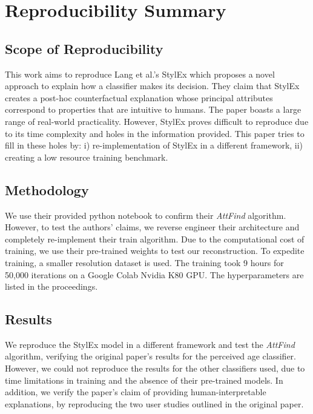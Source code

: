 \section*{\centering Reproducibility Summary}

\subsection*{Scope of Reproducibility}

This work aims to reproduce Lang et al.'s StylEx \cite{Lang2021ExplainingIS} which proposes a novel approach to explain how a classifier makes its decision. They claim that StylEx creates a post-hoc counterfactual explanation whose principal attributes correspond to properties that are intuitive to humans. The paper boasts a large range of real-world practicality. However, StylEx proves difficult to reproduce due to its time complexity and holes in the information provided. This paper tries to fill in these holes by: i) re-implementation of StylEx in a different framework, ii) creating a low resource training benchmark.

\subsection*{Methodology}

We use their provided python notebook to confirm their \textit{AttFind} algorithm. However, to test the authors' claims, we reverse engineer their architecture and completely re-implement their train algorithm. Due to the computational cost of training, we use their pre-trained weights to test our reconstruction. To expedite training, a smaller resolution dataset is used. The training took 9 hours for 50,000 iterations on a Google Colab Nvidia K80 GPU. The hyperparameters are listed in the proceedings.

\subsection*{Results}

We reproduce the StylEx model in a different framework and test the \textit{AttFind} algorithm, verifying the original paper's results for the perceived age classifier. However, we could not reproduce the results for the other classifiers used, due to time limitations in training and the absence of their pre-trained models. In addition, we verify the paper's claim of providing human-interpretable explanations, by reproducing the two user studies outlined in the original paper.

